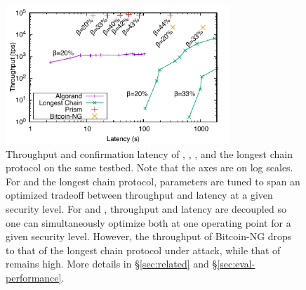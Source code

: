 \begin{figure} 
    \centering
    \includegraphics[width=0.75\textwidth]{figures/compare-fig.pdf}
    \caption[Throughput and confirmation latency of Prism, Algorand, Bitcoin-NG, and the longest chain protocol on the same testbed.]{Throughput and confirmation latency of \prism, \algorand, \bng, and the longest chain protocol on the same testbed. Note that the axes are on log scales. For \algorand and the longest chain protocol, parameters are tuned to span an optimized tradeoff between throughput and latency at a given security level. For \bng and \prism, throughput and latency are decoupled so one can simultaneously optimize both at one operating point for a given security level. However, the throughput of Bitcoin-NG drops to that of the longest chain protocol under attack, while that of \prism remains high. More details in \S\ref{sec:related} and \S\ref{sec:eval-performance}. }
    \label{fig:compare}
\end{figure}

